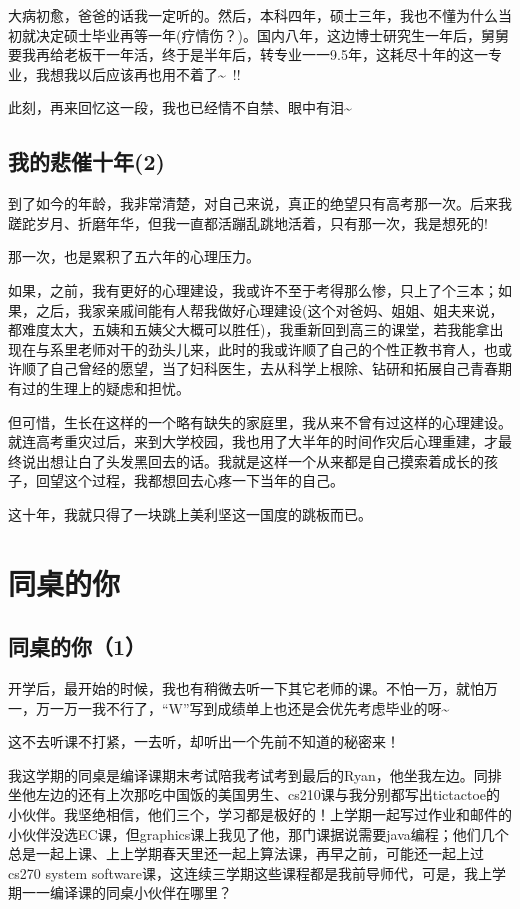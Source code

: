 \documentclass[12pt]{book}
\begin{document}
大病初愈，爸爸的话我一定听的。然后，本科四年，硕士三年，我也不懂为什么当初就决定硕士毕业再等一年(疗情伤？)。国内八年，这边博士研究生一年后，舅舅要我再给老板干一年活，终于是半年后，转专业一一9.5年，这耗尽十年的这一专业，我想我以后应该再也用不着了\textasciitilde{}~!!

此刻，再来回忆这一段，我也已经情不自禁、眼中有泪\textasciitilde{}~

\section{我的悲催十年(2)}
\label{sec-22-2}

到了如今的年龄，我非常清楚，对自己来说，真正的绝望只有高考那一次。后来我蹉跎岁月、折磨年华，但我一直都活蹦乱跳地活着，只有那一次，我是想死的!

那一次，也是累积了五六年的心理压力。

如果，之前，我有更好的心理建设，我或许不至于考得那么惨，只上了个三本；如果，之后，我家亲戚间能有人帮我做好心理建设(这个对爸妈、姐姐、姐夫来说，都难度太大，五姨和五姨父大概可以胜任)，我重新回到高三的课堂，若我能拿出现在与系里老师对干的劲头儿来，此时的我或许顺了自己的个性正教书育人，也或许顺了自己曾经的愿望，当了妇科医生，去从科学上根除、钻研和拓展自己青春期有过的生理上的疑虑和担忧。

但可惜，生长在这样的一个略有缺失的家庭里，我从来不曾有过这样的心理建设。就连高考重灾过后，来到大学校园，我也用了大半年的时间作灾后心理重建，才最终说出想让白了头发黑回去的话。我就是这样一个从来都是自己摸索着成长的孩子，回望这个过程，我都想回去心疼一下当年的自己。

这十年，我就只得了一块跳上美利坚这一国度的跳板而已。

\chapter{同桌的你}
\label{sec-23}
\section{同桌的你（1）}
\label{sec-23-1}

开学后，最开始的时候，我也有稍微去听一下其它老师的课。不怕一万，就怕万一，万一万一我不行了，“W”写到成绩单上也还是会优先考虑毕业的呀\textasciitilde{}~

这不去听课不打紧，一去听，却听出一个先前不知道的秘密来！

我这学期的同桌是编译课期末考试陪我考试考到最后的Ryan，他坐我左边。同排坐他左边的还有上次那吃中国饭的美国男生、cs210课与我分别都写出tictactoe的小伙伴。我坚绝相信，他们三个，学习都是极好的！上学期一起写过作业和邮件的小伙伴没选EC课，但graphics课上我见了他，那门课据说需要java编程；他们几个总是一起上课、上上学期春天里还一起上算法课，再早之前，可能还一起上过cs270 system software课，这连续三学期这些课程都是我前导师代，可是，我上学期一一编译课的同桌小伙伴在哪里？
\end{document}
